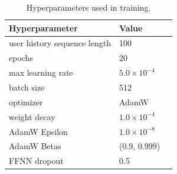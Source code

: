 \documentclass{bioinfo}
\begin{document}
\begin{methods}
\begin{table}[h]
\centering
\begin{tabular}{|l|l|l|}
\hline
\textbf{Hyperparameter} &  \textbf{Value} \\ \hline

user history sequence length & 100 \\ \hline
epochs & 20\\ \hline
max learning rate & $5.0 \times 10^{-4}$\\ \hline
batch size & 512 \\ \hline
optimizer & AdamW \\ \hline
weight decay & $1.0 \times 10^{-4}$ \\ \hline
AdamW Epsilon & $1.0 \times 10^{-8}$ \\ \hline
AdamW Betas &  (0.9, 0.999)\\ \hline
FFNN dropout &  0.5 \\ \hline

\end{tabular}
\caption{Hyperparameters used in training.}
\label{tab:hyper}
\end{table}






\end{methods}
\end{document}
